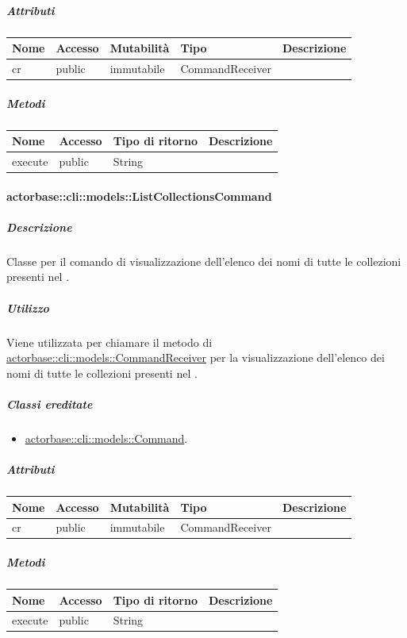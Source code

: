 \documentclass{scalatekids-article}
\begin{document}
\subparagraph{Attributi}

\begin{tabular}{| l | l | l | l | l |}
	\hline
	Nome & Accesso & Mutabilità & Tipo & Descrizione\\
	\hline
	cr & public & immutabile & CommandReceiver & \\
	\hline
\end{tabular}

\subparagraph{Metodi}

\begin{tabular}{| l | l | l | l |}
	\hline
	Nome & Accesso & Tipo di ritorno & Descrizione\\
	\hline
	execute & public & String & \\
	\hline
\end{tabular}

\paragraph{actorbase::cli::models::ListCollectionsCommand}
\label{sec:actorbase::cli::models::ListCommand}

\subparagraph{Descrizione}

Classe per il comando di visualizzazione dell'elenco dei nomi di tutte le
collezioni presenti nel .

\subparagraph{Utilizzo}

Viene utilizzata per chiamare il metodo di
\hyperref[sec:actorbase::cli::models::CommandReceiver]{actorbase::cli::models::CommandReceiver} per la visualizzazione dell'elenco dei
nomi di tutte le collezioni presenti nel .

\subparagraph{Classi ereditate}

\begin{itemize}
\item \hyperref[sec:actorbase::cli::models::Command]{actorbase::cli::models::Command}.
\end{itemize}

\subparagraph{Attributi}

\begin{tabular}{| l | l | l | l | l |}
	\hline
	Nome & Accesso & Mutabilità & Tipo & Descrizione\\
	\hline
	cr & public & immutabile & CommandReceiver & \\
	\hline
\end{tabular}

\subparagraph{Metodi}

\begin{tabular}{| l | l | l | l |}
	\hline
	Nome & Accesso & Tipo di ritorno & Descrizione\\
	\hline
	execute & public & String & \\
	\hline
\end{tabular}
\end{document}
